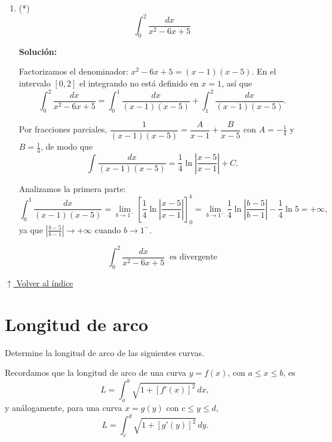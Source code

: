 \documentclass[12pt]{article}
\newcommand{\solucion}{%
    \vspace{0.8em}%
    \textbf{Solución:}%
}
\newcommand{\volverindice}{%
    \vspace{1em}%
    \begin{flushright}%
        \hyperlink{indice}{\small $\uparrow$ Volver al índice}%
    \end{flushright}%
}
\begin{document}
\begin{enumerate}[label=\alph*.-]
    Observación: si se ignorara la discontinuidad y se aplicara
    directamente la regla de Barrow, se obtendría
    $\left[-\frac1x\right]_{-1}^{1}=-2$, un resultado absurdo, ya que el
    integrando es siempre positivo.


    \item (*)
    \[
    \int_{0}^{2}\frac{dx}{x^2-6x+5}
    \]

    \solucion

    Factorizamos el denominador: $x^2-6x+5=(x-1)(x-5)$. En el intervalo
    $[0,2]$ el integrando no está definido en $x=1$, así que
    \[
    \int_{0}^{2}\frac{dx}{x^2-6x+5}
    =\int_{0}^{1}\frac{dx}{(x-1)(x-5)}+\int_{1}^{2}\frac{dx}{(x-1)(x-5)}.
    \]

    Por fracciones parciales,
    $\dfrac{1}{(x-1)(x-5)}=\dfrac{A}{x-1}+\dfrac{B}{x-5}$ con
    $A=-\frac14$ y $B=\frac14$, de modo que
    \[
    \int\frac{dx}{(x-1)(x-5)}=\frac14\ln\left|\frac{x-5}{x-1}\right|+C.
    \]

    Analizamos la primera parte:
    \[
    \int_{0}^{1}\frac{dx}{(x-1)(x-5)}
    =\lim_{b\to1^-}\left[\frac14\ln\left|\frac{x-5}{x-1}\right|\right]_{0}^{b}
    =\lim_{b\to1^-}\frac14\ln\left|\frac{b-5}{b-1}\right|-\frac14\ln5=+\infty,
    \]
    ya que $\left|\frac{b-5}{b-1}\right|\to+\infty$ cuando $b\to1^-$.

    \[
    \boxed{
    \int_{0}^{2}\frac{dx}{x^2-6x+5}\ \text{ es divergente}
    }
    \]

\end{enumerate}

\volverindice
\newpage


\section{Longitud de arco}

Determine la longitud de arco de las siguientes curvas.

Recordamos que la longitud de arco de una curva $y=f(x)$, con
$a\le x\le b$, es
\[
L=\int_{a}^{b}\sqrt{1+\left[f'(x)\right]^2}\,dx,
\]
y análogamente, para una curva $x=g(y)$ con $c\le y\le d$,
\[
L=\int_{c}^{d}\sqrt{1+\left[g'(y)\right]^2}\,dy.
\]
\end{document}
